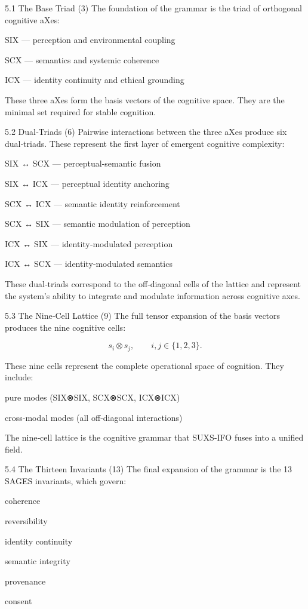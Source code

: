 5.1 The Base Triad (3) The foundation of the grammar is the triad of orthogonal cognitive aXes:

SIX --- perception and environmental coupling

SCX --- semantics and systemic coherence

ICX --- identity continuity and ethical grounding

These three aXes form the basis vectors of the cognitive space. They are the minimal set required for stable cognition.

5.2 Dual‑Triads (6) Pairwise interactions between the three aXes produce six dual‑triads. These represent the first layer of emergent cognitive complexity:

SIX ↔ SCX --- perceptual‑semantic fusion

SIX ↔ ICX --- perceptual identity anchoring

SCX ↔ ICX --- semantic identity reinforcement

SCX ↔ SIX --- semantic modulation of perception

ICX ↔ SIX --- identity‑modulated perception

ICX ↔ SCX --- identity‑modulated semantics

These dual‑triads correspond to the off‑diagonal cells of the lattice and represent the system's ability to integrate and modulate information across cognitive axes.

5.3 The Nine‑Cell Lattice (9) The full tensor expansion of the basis vectors produces the nine cognitive cells:

\[
s_i \otimes s_j,\qquad i,j\in\{1,2,3\}.
\]

These nine cells represent the complete operational space of cognition. They include:

pure modes (SIX⊗SIX, SCX⊗SCX, ICX⊗ICX)

cross‑modal modes (all off‑diagonal interactions)

The nine‑cell lattice is the cognitive grammar that SUXS-IFO fuses into a unified field.

5.4 The Thirteen Invariants (13) The final expansion of the grammar is the 13 SAGES invariants, which govern:

coherence

reversibility

identity continuity

semantic integrity

provenance

consent

